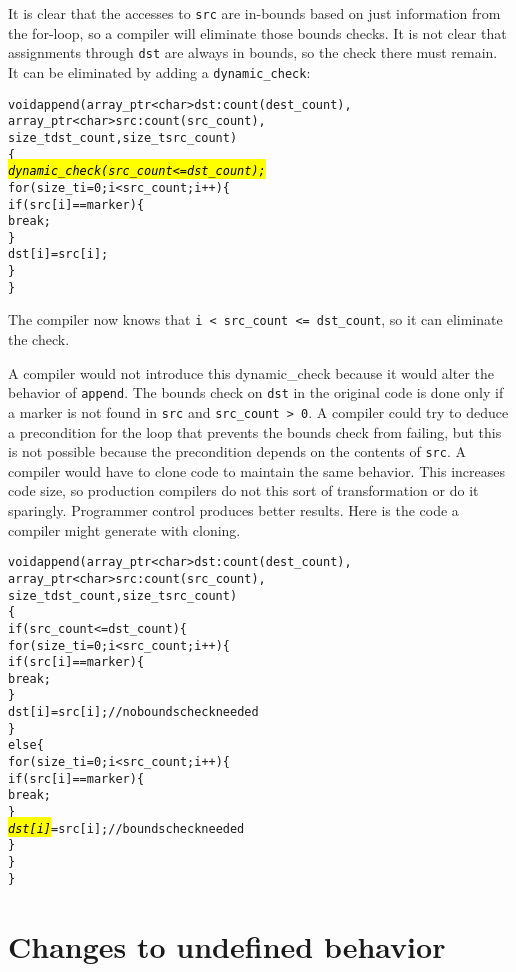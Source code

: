 It is clear that the accesses to \texttt{src} are in-bounds based on
just information from the for-loop, so a compiler will eliminate those
bounds checks. It is not clear that assignments through \texttt{dst} are
always in bounds, so the check there must remain. It can be eliminated
by adding a \texttt{dynamic\_check}:

\begin{alltt}
void append(array\_ptr<char> dst: count(dest\_count), 
            array\_ptr<char> src : count(src\_count), 
            size\_t dst\_count, size\_t src\_count)
\{ 
    \hl{\textit{dynamic\_check(src\_count <= dst\_count);}}
    for (size\_t i = 0; i < src\_count; i++) \{
        if (src[i] == marker) \{
            break;
        \}
        dst[i] = src[i];
    \}
\}
\end{alltt}

The compiler now knows that \texttt{i < src\_count
<= dst\_count}, so it can eliminate the check.

A compiler would not introduce this dynamic\_check because it would
alter the behavior of \texttt{append}. The bounds check on \texttt{dst}
in the original code is done only if a marker is not found in
\texttt{src} and \texttt{src\_count \textgreater{} 0}. A compiler could
try to deduce a precondition for the loop 
that prevents the bounds check from failing, but this is
not possible because the precondition depends on the contents of
\texttt{src}. A compiler would have to clone code to maintain the same
behavior. This increases code size, so production compilers do not this
sort of transformation or do it sparingly. Programmer control produces
better results.   Here is the code a compiler might generate with cloning.

\begin{alltt}
void append(array\_ptr<char> dst: count(dest\_count), 
            array\_ptr<char> src : count(src\_count), 
            size\_t dst\_count, size_t src\_count)
\{ 
    if (src\_count <= dst\_count) \{
        for (size\_t i = 0; i < src\_count; i++) \{
            if (src[i] == marker) \{
                break;
            \}
            dst[i] = src[i];  // no bounds check needed
        \}   
    else \{
        for (size\_t i = 0; i < src\_count; i++) \{
            if (src[i] == marker) \{
                break;
            \}
            \hl{\textit{dst[i]}} = src[i];  // bounds check needed
        \}   
    \}
\}
\end{alltt}

\section{Changes to undefined behavior}
\label{section:changes-to-undefined-behavior}

